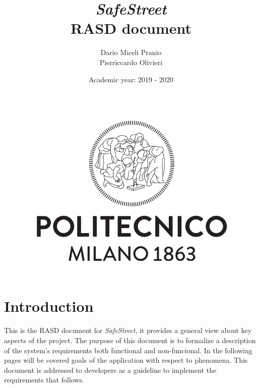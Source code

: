\documentclass{article}
\title{
    \textbf{\textit{SafeStreet}} \\
    \textbf{RASD document}}
\date{Academic year: 2019 - 2020}
\author{
    Dario Miceli Pranio \\
    Pierriccardo Olivieri
}
\begin{document}

\maketitle

\begin{figure}[h!]
    \centering
    \includegraphics[scale=0.5]{img/logo.png}
\end{figure}

\newpage
{}
\tableofcontents

\newpage
\section{Introduction}
This is the RASD document for \textit{SafeStreet}, 
it provides a general view about key aspects of the project. The purpose of this document is to formalize a description
of the system's requirements both functional and non-funcional. In the following pages will be covered goals of the 
application with respect to phenomena. This document is addressed to developers as a guideline to implement the requirements
that follows.  
\end{document}
